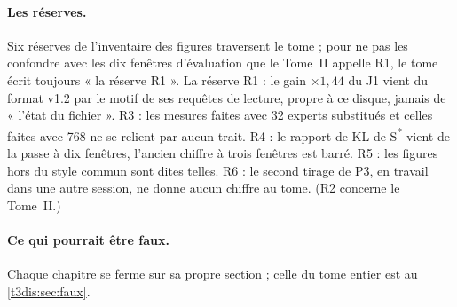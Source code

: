 \paragraph{Les réserves.} Six réserves de l'inventaire des figures traversent le tome ; pour ne pas les confondre avec les dix fenêtres d'évaluation que le Tome~II appelle R1, le tome écrit toujours « la réserve R1 ». La réserve R1 : le gain $\times 1{,}44$ du J1 vient du format v1.2 par le motif de ses requêtes de lecture, propre à ce disque, jamais de « l'état du fichier ». R3 : les mesures faites avec 32 experts substitués et celles faites avec 768 ne se relient par aucun trait. R4 : le rapport de KL de S\textsuperscript{*} vient de la passe à dix fenêtres, l'ancien chiffre à trois fenêtres est barré. R5 : les figures hors du style commun sont dites telles. R6 : le second tirage de P3, en travail dans une autre session, ne donne aucun chiffre au tome. (R2 concerne le Tome~II.)

\paragraph{Ce qui pourrait être faux.} Chaque chapitre se ferme sur sa propre section ; celle du tome entier est au \cref{t3dis:sec:faux}.

